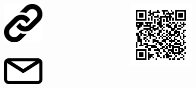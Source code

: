 \begin{columns}[c]
	\begin{column}{0.7\textwidth}
		\begin{columns}[c]
			\begin{column}{0.2\textwidth}
				\begin{figure}[h]
					\includegraphics[width=2cm]{icons/url.pdf}
				\end{figure}
			\end{column}
			\begin{column}{0.8\textwidth}
				\large{
					\color{boxbkseablue}
					\textbf{\getUrlList}
				}
			\end{column}
		\end{columns}
		\begin{columns}[c]
			\begin{column}{0.2\textwidth}
				\begin{figure}[h]
					\includegraphics[width=2cm]{icons/mail.pdf}
				\end{figure}
			\end{column}
			\begin{column}{0.8\textwidth}
				\large{ 
					\color{boxbkseablue}
					\textbf{\getContactsList}
				}
			\end{column}
		\end{columns}
	\end{column}
	\begin{column}{0.3\textwidth}
		\begin{figure}[h]
			\includegraphics[width=0.6\columnwidth]{docs/imgs/poc.png}
		\end{figure}
		\hfill
	\end{column}
\end{columns}
\vskip1cm